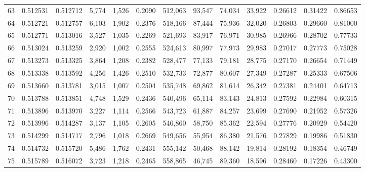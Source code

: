 \begin{tabular}{rrrrrrrrrrrrr}
63 &  0.512531 &  0.512712 &   5,774 &  1,526 &                                     0.2090 &  512,063 &   93,547 &   74,034 &   33,922 &  0.26612 &  0.31422 &  0.86653 \\
64 &  0.512721 &  0.512757 &   6,103 &  1,902 &                                     0.2376 &  518,166 &   87,444 &   75,936 &   32,020 &  0.26803 &  0.29660 &  0.81000 \\
65 &  0.512771 &  0.513016 &   3,527 &  1,035 &                                     0.2269 &  521,693 &   83,917 &   76,971 &   30,985 &  0.26966 &  0.28702 &  0.77733 \\
66 &  0.513024 &  0.513259 &   2,920 &  1,002 &                                     0.2555 &  524,613 &   80,997 &   77,973 &   29,983 &  0.27017 &  0.27773 &  0.75028 \\
67 &  0.513273 &  0.513325 &   3,864 &  1,208 &                                     0.2382 &  528,477 &   77,133 &   79,181 &   28,775 &  0.27170 &  0.26654 &  0.71449 \\
68 &  0.513338 &  0.513592 &   4,256 &  1,426 &                                     0.2510 &  532,733 &   72,877 &   80,607 &   27,349 &  0.27287 &  0.25333 &  0.67506 \\
69 &  0.513660 &  0.513781 &   3,015 &  1,007 &                                     0.2504 &  535,748 &   69,862 &   81,614 &   26,342 &  0.27381 &  0.24401 &  0.64713 \\
70 &  0.513788 &  0.513851 &   4,748 &  1,529 &                                     0.2436 &  540,496 &   65,114 &   83,143 &   24,813 &  0.27592 &  0.22984 &  0.60315 \\
71 &  0.513896 &  0.513970 &   3,227 &  1,114 &                                     0.2566 &  543,723 &   61,887 &   84,257 &   23,699 &  0.27690 &  0.21952 &  0.57326 \\
72 &  0.513996 &  0.514287 &   3,137 &  1,105 &                                     0.2605 &  546,860 &   58,750 &   85,362 &   22,594 &  0.27776 &  0.20929 &  0.54420 \\
73 &  0.514299 &  0.514717 &   2,796 &  1,018 &                                     0.2669 &  549,656 &   55,954 &   86,380 &   21,576 &  0.27829 &  0.19986 &  0.51830 \\
74 &  0.514732 &  0.515720 &   5,486 &  1,762 &                                     0.2431 &  555,142 &   50,468 &   88,142 &   19,814 &  0.28192 &  0.18354 &  0.46749 \\
75 &  0.515789 &  0.516072 &   3,723 &  1,218 &                                     0.2465 &  558,865 &   46,745 &   89,360 &   18,596 &  0.28460 &  0.17226 &  0.43300 \\

\end{tabular}
